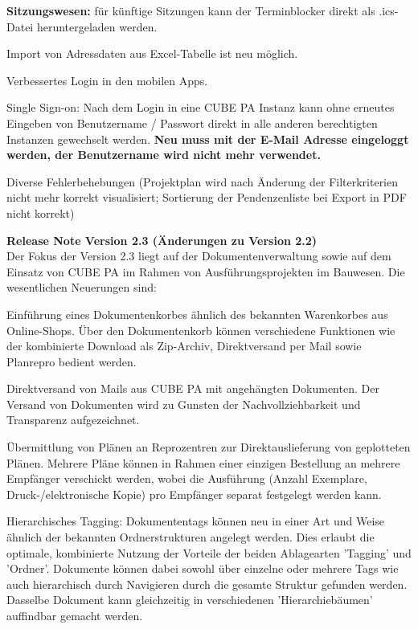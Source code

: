 \begin{compactitem}
  \item \textbf{Sitzungswesen:} für künftige Sitzungen kann der Terminblocker direkt als .ics-Datei heruntergeladen werden.
	\item Import von Adressdaten aus Excel-Tabelle ist neu möglich.
	\item Verbessertes Login in den mobilen Apps.
	\item Single Sign-on: Nach dem Login in eine CUBE PA Instanz kann ohne erneutes Eingeben von Benutzername / Passwort direkt in alle anderen berechtigten Instanzen gewechselt werden. \textbf{Neu muss mit der E-Mail Adresse eingeloggt werden, der Benutzername wird nicht mehr verwendet.}
	\item Diverse Fehlerbehebungen (Projektplan wird nach Änderung der Filterkriterien nicht mehr korrekt visualisiert; Sortierung der Pendenzenliste bei Export in PDF nicht korrekt)	
\end{compactitem}

\vspace{\baselineskip}

\textbf{Release Note Version 2.3 (Änderungen zu Version 2.2)} \\
Der Fokus der Version 2.3 liegt auf der Dokumentenverwaltung sowie auf dem Einsatz von CUBE PA im Rahmen von Ausführungsprojekten im Bauwesen. Die wesentlichen Neuerungen sind:

\begin{compactitem}
	\item Einführung eines Dokumentenkorbes ähnlich des bekannten Warenkorbes aus Online-Shops. Über den Dokumentenkorb können verschiedene Funktionen wie der kombinierte Download als Zip-Archiv, Direktversand per Mail sowie Planrepro bedient werden.
	\item Direktversand von Mails aus CUBE PA mit angehängten Dokumenten. Der Versand von Dokumenten wird zu Gunsten der Nachvollziehbarkeit und Transparenz aufgezeichnet.
	\item Übermittlung von Plänen an Reprozentren zur Direktauslieferung von geplotteten Plänen. Mehrere Pläne können in Rahmen einer einzigen Bestellung an mehrere Empfänger verschickt werden, wobei die Ausführung (Anzahl Exemplare, Druck-/elektronische Kopie) pro Empfänger separat festgelegt werden kann.
	\item Hierarchisches Tagging: Dokumententags können neu in einer Art und Weise ähnlich der bekannten Ordnerstrukturen angelegt werden. Dies erlaubt die optimale, kombinierte Nutzung der Vorteile der beiden Ablagearten 'Tagging' und 'Ordner'. Dokumente können dabei sowohl über einzelne oder mehrere Tags wie auch hierarchisch durch Navigieren durch die gesamte Struktur gefunden werden. Dasselbe Dokument kann gleichzeitig in verschiedenen 'Hierarchiebäumen' auffindbar gemacht werden.
	
\end{compactitem}

